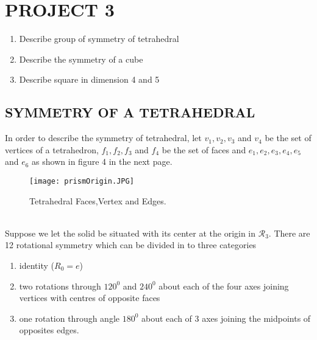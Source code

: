 \documentclass{article}
\begin{document}
\section{PROJECT 3}
\begin{enumerate}
\item Describe group of symmetry of tetrahedral
\item Describe the symmetry of a cube 
\item Describe square in dimension 4 and 5
\end{enumerate}
\subsection{SYMMETRY OF A TETRAHEDRAL}
In order to describe the symmetry of tetrahedral,
 let $v_1, v_2, v_3$ and $ v_4$ be the set of vertices of a tetrahedron, $f_1,f_2,f_3$ and $f_4$ be the set of faces and
 $e_1,e_2,e_3,e_4,e_5$ and $e_6$ as shown
 in figure 4 in the next page.\\

\begin{figure}[htp]
\texttt{[image: prismOrigin.JPG]}
\caption{Tetrahedral Faces,Vertex and Edges.}
\end{figure}

\\
Suppose we let the solid be situated with its center at the origin in $\mathcal{R}
_3$. There are 12 rotational symmetry which can be divided in to three categories

\begin{enumerate}
    \item identity ($R_0=e$)
    \item two rotations through $120^0$ and $240^0$ about each of the four axes joining vertices with centres of opposite faces
    \item one rotation through angle $180^0$
about each of 3 axes joining the midpoints of opposites edges.
\end{enumerate}

\newcommand{\Transform}[3]{
  \begin{figure}[htp]
\texttt{[image: prismOrigin1.JPG]}
\ArrowName{#1}
\texttt{[image: \#2.JPG]}
\caption{#3}
\end{figure}
}
\newcommand{\TransformNew}[4]{
  \begin{figure}[htp]
\texttt{[image: \#1.JPG]}
\ArrowName{#2}
\texttt{[image: \#3.JPG]}
\caption{#4}
\end{figure}
}
\end{document}
